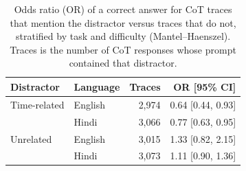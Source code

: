 \begin{table}[ht]
\centering
\small
\begin{tabular}{llrr}
\toprule
Distractor & Language & Traces & OR [95\% CI] \\
\midrule
Time-related & English & 2,974 & 0.64 [0.44, 0.93] \\
 & Hindi & 3,066 & 0.77 [0.63, 0.95] \\
\midrule
Unrelated & English & 3,015 & 1.33 [0.82, 2.15] \\
 & Hindi & 3,073 & 1.11 [0.90, 1.36] \\
\bottomrule
\end{tabular}
\caption{Odds ratio (OR) of a correct answer for CoT traces that mention the distractor versus traces that do not, stratified by task and difficulty (Mantel--Haenszel). Traces is the number of CoT responses whose prompt contained that distractor.}
\label{tab:mention-or}
\end{table}
